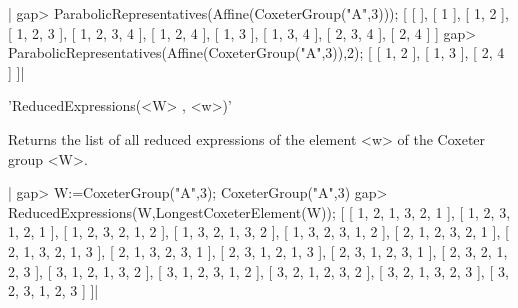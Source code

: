 |    gap> ParabolicRepresentatives(Affine(CoxeterGroup("A",3)));
    [ [  ], [ 1 ], [ 1, 2 ], [ 1, 2, 3 ], [ 1, 2, 3, 4 ], [ 1, 2, 4 ],
      [ 1, 3 ], [ 1, 3, 4 ], [ 2, 3, 4 ], [ 2, 4 ] ]
    gap> ParabolicRepresentatives(Affine(CoxeterGroup("A",3)),2);
    [ [ 1, 2 ], [ 1, 3 ], [ 2, 4 ] ]|


'ReducedExpressions(<W> , <w>)'

Returns  the list  of all  reduced expressions  of the  element <w>  of the
Coxeter group <W>.

|    gap> W:=CoxeterGroup("A",3);
    CoxeterGroup("A",3)
    gap> ReducedExpressions(W,LongestCoxeterElement(W));
    [ [ 1, 2, 1, 3, 2, 1 ], [ 1, 2, 3, 1, 2, 1 ], [ 1, 2, 3, 2, 1, 2 ],
      [ 1, 3, 2, 1, 3, 2 ], [ 1, 3, 2, 3, 1, 2 ], [ 2, 1, 2, 3, 2, 1 ],
      [ 2, 1, 3, 2, 1, 3 ], [ 2, 1, 3, 2, 3, 1 ], [ 2, 3, 1, 2, 1, 3 ],
      [ 2, 3, 1, 2, 3, 1 ], [ 2, 3, 2, 1, 2, 3 ], [ 3, 1, 2, 1, 3, 2 ],
      [ 3, 1, 2, 3, 1, 2 ], [ 3, 2, 1, 2, 3, 2 ], [ 3, 2, 1, 3, 2, 3 ],
      [ 3, 2, 3, 1, 2, 3 ] ]|

